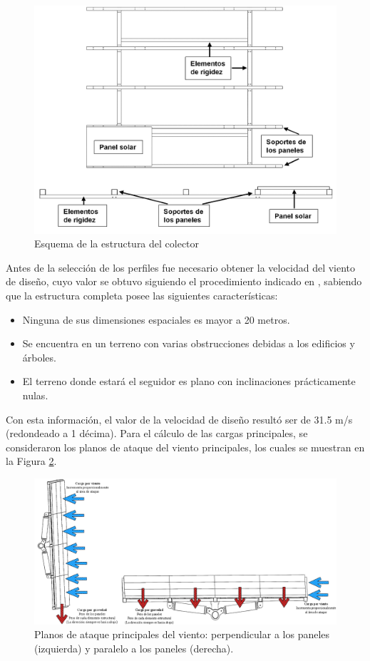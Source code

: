 \begin{figure}[H]
	\centering
	\includegraphics[width=\columnwidth]{imagenes/Esquema_de_la_estructura_del_colector.png}
	\caption{Esquema de la estructura del colector}
	\label{fig:colector1}
\end{figure}

Antes de la selección de los perfiles fue necesario obtener la velocidad del viento de diseño, cuyo valor se obtuvo siguiendo el procedimiento indicado en \cite{DDA9}, sabiendo que la estructura completa posee las siguientes características:

\begin{itemize}
    \item Ninguna de sus dimensiones espaciales es mayor a 20 metros.
	\item Se encuentra en un terreno con varias obstrucciones debidas a los edificios y árboles.
	\item El terreno donde estará el seguidor es plano con inclinaciones prácticamente nulas.
\end{itemize}

Con esta información, el valor de la velocidad de diseño resultó ser de 31.5 m/s (redondeado a 1 décima). Para el cálculo de las cargas principales, se consideraron los planos de ataque del viento principales, los cuales se muestran en la Figura \ref{fig:ataca_viento}.
\begin{figure}[H]
	\centering
	\includegraphics[width=\columnwidth]{imagenes/ataca_viento}
	\caption{Planos de ataque principales del viento: perpendicular a los paneles (izquierda) y paralelo a los paneles (derecha).}
	\label{fig:ataca_viento}
\end{figure}

